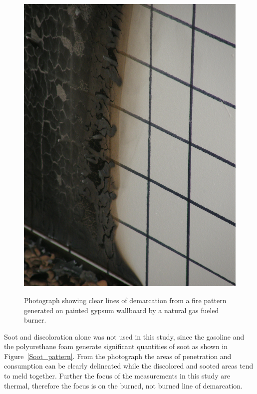 \documentclass[twoside]{uocthesis}
\begin{document}
\begin{figure}[p]
	\centering
	\includegraphics[width=\textwidth]{../Figures/demarcation}  \\
	\caption[Photograph showing clear lines of demarcation]{Photograph showing clear lines of demarcation from a fire pattern generated on painted gypsum wallboard by a natural gas fueled burner.}
	\label{demarcation}
\end{figure}

Soot and discoloration alone was not used in this study, since the gasoline and the polyurethane foam generate significant quantities of soot as shown in Figure~\ref{Soot_pattern}.  From the photograph the areas of penetration and consumption can be clearly delineated while the discolored and sooted areas tend to meld together.  Further the focus of the measurements in this study are thermal, therefore the focus is on the burned, not burned line of demarcation.
\end{document}
